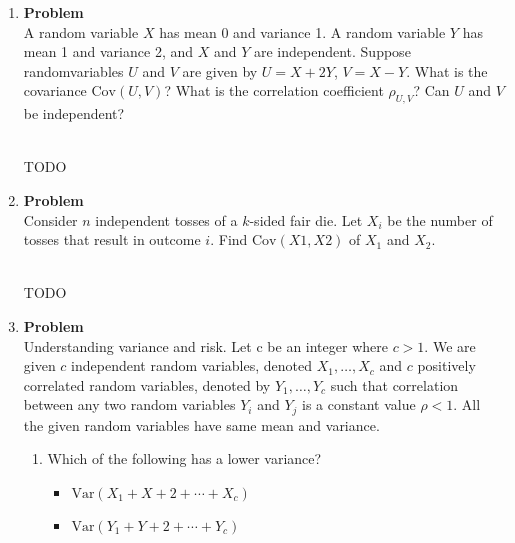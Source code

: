 \documentclass[12pt]{article}
\newenvironment{Ex}{\textbf{Problem}\vspace{.75em}\\}{}
\begin{document}
\begin{enumerate}
\begin{Ex}
    $f_Y$. Derive a formula for the PDF of the random variable $X+Y$.
    \begin{solution} \hfill \vspace{.75em} \\
      {\color{red} \huge TODO}
    \end{solution}
  \end{Ex}
\item
  \begin{Ex}
    A random variable $X$ has mean 0 and variance 1. A random variable
    $Y$ has mean 1 and variance 2, and $X$ and $Y$ are
    independent. Suppose randomvariables $U$ and $V$ are given by
    $U=X+2Y$, $V = X−Y$. What is the covariance $\text{Cov}(U,V)$?
    What is the correlation coefficient $\rho_{U,V}$? Can $U$ and $V$
    be independent?
    \begin{solution} \hfill \vspace{.75em} \\
      {\color{red} \huge TODO}
    \end{solution}
  \end{Ex}
\item
  \begin{Ex}
    Consider $n$ independent tosses of a $k$-sided fair die. Let $X_i$
    be the number of tosses that result in outcome $i$. Find
    $\text{Cov}(X1 , X2)$ of $X_1$ and $X_2$.
    \begin{solution} \hfill \vspace{.75em} \\
      {\color{red} \huge TODO}
    \end{solution}
  \end{Ex}
\item
  \begin{Ex}
    Understanding variance and risk. Let c be an integer where $c >
    1$. We are given $c$ independent random variables, denoted $X_1,
    \ldots ,X_c$ and $c$ positively correlated random variables,
    denoted by $Y_1, \ldots, Y_c$ such that correlation between any
    two random variables $Y_i$ and $Y_j$ is a constant value $\rho <
    1$. All the given random variables have same mean and variance.
    \begin{enumerate}
    \item Which of the following has a lower variance?
      \begin{itemize}
      \item $\text{Var}(X_1 + X+2 + \cdots + X_c)$
      \item $\text{Var}(Y_1 + Y+2 + \cdots + Y_c)$

\end{itemize}
\end{enumerate}
\end{Ex}
\end{enumerate}
\end{document}
